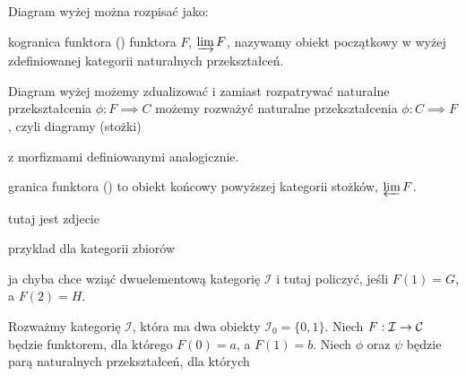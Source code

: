 Diagram wyżej można rozpisać jako:
\begin{center}
\end{center}

\begin{definition}{kogranica funktora}{}
   () funktora $F$, $\varinjlim F$, nazywamy obiekt początkowy w wyżej zdefiniowanej kategorii naturalnych przekształceń. 
\end{definition}

Diagram wyżej możemy zdualizować i zamiast rozpatrywać naturalne przekształcenia $\phi:F\implies C$ możemy rozważyć naturalne przekształcenia $\phi:C\implies F$, czyli diagramy (stożki)
\begin{center}
\end{center}
z morfizmami definiowanymi analogicznie. 

\begin{definition}{granica funktora}{}
   () to obiekt końcowy powyższej kategorii stożków, $\varprojlim F$.
\end{definition}

{\color{red}tutaj jest zdjecie

przyklad dla kategorii zbiorów

ja chyba chce wziąć dwuelementową kategorię $\mathcal{I}$ i tutaj policzyć, jeśli $F(1)=G$, a $F(2)=H$.
}
  
Rozważmy kategorię $\mathcal{I}$, która ma dwa obiekty $\mathcal{I}_0=\{0,1\}$. Niech $F:\mathcal{I}\to \mathcal{C}$ będzie funktorem, dla którego $F(0)=a$, a $F(1)=b$. Niech $\phi$ oraz $\psi$ będzie parą naturalnych przekształceń, dla których
\begin{center}
\end{center}

